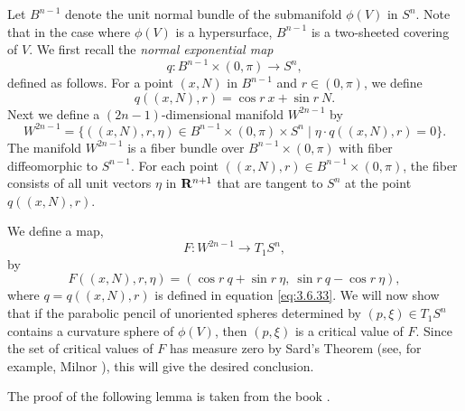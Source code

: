 \documentclass[12pt]{article}
\begin{document}
Let $B^{n-1}$ denote the unit normal
bundle of the submanifold $\phi (V)$ in $S^n$.  Note that in the case where
$\phi (V)$ is a hypersurface, $B^{n-1}$ is a two-sheeted covering of $V$.  We first recall the 
{\em normal exponential map} 
\begin{displaymath}q: B^{n-1} \times (0,\pi) \rightarrow S^n,
\end{displaymath}
defined as follows. For a point $(x,N)$ in $B^{n-1}$ and $r \in (0,\pi)$, we define
\begin{equation}
\label{eq:3.6.33}
q((x,N),r) = \cos r\  x + \sin r\  N.
\end{equation}
Next we define a $(2n-1)$-dimensional manifold $W^{2n-1}$ by
\begin{equation}
\label{eq:3.6.34}
W^{2n-1} = \{((x,N),r,\eta) \in B^{n-1} \times (0,\pi) \times S^n \mid  \eta \cdot q((x,N),r) = 0\}.
\end{equation}
The manifold $W^{2n-1}$ is a fiber bundle over $B^{n-1} \times (0,\pi)$ with fiber diffeomorphic to $S^{n-1}$.
For each point $((x,N),r) \in B^{n-1} \times (0,\pi)$, the fiber consists of all unit vectors 
$\eta$ in ${\bf R}^{n+1}$
that are tangent to $S^n$ at the point $q((x,N),r)$.

We define a map,
\begin{equation}
\label{eq:3.6.35}
F: W^{2n-1} \rightarrow T_1S^n,
\end{equation}
by
\begin{equation}
\label{eq:3.6.35a}
F((x,N),r,\eta) = (\cos r\  q + \sin r\  \eta,\   \sin r\  q - \cos r\  \eta),
\end{equation}
where $q = q((x,N),r)$ is defined in equation \eqref{eq:3.6.33}.
We will now show
that if the parabolic pencil of unoriented spheres 
determined by $(p,\xi)\in T_1S^n$ 
contains a curvature sphere of $\phi (V)$,
then $(p,\xi)$ is a critical value of $F$.  Since the set of critical values of $F$ has measure zero by 
Sard's Theorem
(see, for example, Milnor \cite[p. 33]{Mil}), this will give the desired conclusion.

The proof of the following lemma is taken from the book \cite[pp. 89--92]{Cec1}.
\end{document}
